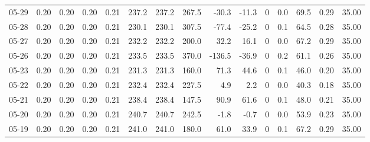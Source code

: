 \begin{threeparttable}
{\begin{tabular}{lrrrrrrrrrrrrrr}
  05-29 &          0.20 &          0.20 &          0.20 &        0.21 &               237.2 &              237.2 &               267.5 &      -30.3 &        -11.3 &              0 &                 0.0 &             69.5 &            0.29 &                  35.00 \\
  05-28 &          0.20 &          0.20 &          0.20 &        0.21 &               230.1 &              230.1 &               307.5 &      -77.4 &        -25.2 &              0 &                 0.1 &             64.5 &            0.28 &                  35.00 \\
  05-27 &          0.20 &          0.20 &          0.20 &        0.21 &               232.2 &              232.2 &               200.0 &       32.2 &         16.1 &              0 &                 0.0 &             67.2 &            0.29 &                  35.00 \\
  05-26 &          0.20 &          0.20 &          0.20 &        0.21 &               233.5 &              233.5 &               370.0 &     -136.5 &        -36.9 &              0 &                 0.2 &             61.1 &            0.26 &                  35.00 \\
  05-23 &          0.20 &          0.20 &          0.20 &        0.21 &               231.3 &              231.3 &               160.0 &       71.3 &         44.6 &              0 &                 0.1 &             46.0 &            0.20 &                  35.00 \\
  05-22 &          0.20 &          0.20 &          0.20 &        0.21 &               232.4 &              232.4 &               227.5 &        4.9 &          2.2 &              0 &                 0.0 &             40.3 &            0.18 &                  35.00 \\
  05-21 &          0.20 &          0.20 &          0.20 &        0.21 &               238.4 &              238.4 &               147.5 &       90.9 &         61.6 &              0 &                 0.1 &             48.0 &            0.21 &                  35.00 \\
  05-20 &          0.20 &          0.20 &          0.20 &        0.21 &               240.7 &              240.7 &               242.5 &       -1.8 &         -0.7 &              0 &                 0.0 &             53.9 &            0.23 &                  35.00 \\
  05-19 &          0.20 &          0.20 &          0.20 &        0.21 &               241.0 &              241.0 &               180.0 &       61.0 &         33.9 &              0 &                 0.1 &             67.2 &            0.29 &                  35.00 \\

\end{tabular}}
\end{threeparttable}
